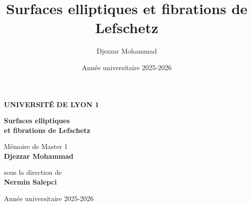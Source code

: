 \documentclass[11pt, a4paper, twoside]{report}
\title{Surfaces elliptiques et fibrations de Lefschetz}
\author{Djezzar Mohammad}
\date{Année universitaire 2025-2026}
\theoremstyle{definition}
\theoremstyle{remark}
\begin{document}
\begin{titlepage}
    \begin{center}
        \vspace*{1cm}
        
        \Large
        \textbf{UNIVERSITÉ DE LYON 1}
        
        \vspace{2cm}
        
        \Huge
        \textbf{Surfaces elliptiques\\ et fibrations de Lefschetz}
        
        \vspace{1.5cm}
        
        \Large
        Mémoire de Master 1\\
        \textbf{Djezzar Mohammad}
        
        \vspace{1cm}
        
        \large
        sous la direction de\\
        \textbf{Nermin Salepci}
        
        \vspace{2cm}
        
        \large
        Année universitaire 2025-2026
        
        \vfill
    \end{center}
\end{titlepage}

\newpage
\thispagestyle{empty}
\mbox{}
\newpage

\tableofcontents
\newpage







\printbibliography[heading=bibintoc]

\printindex
\end{document}
